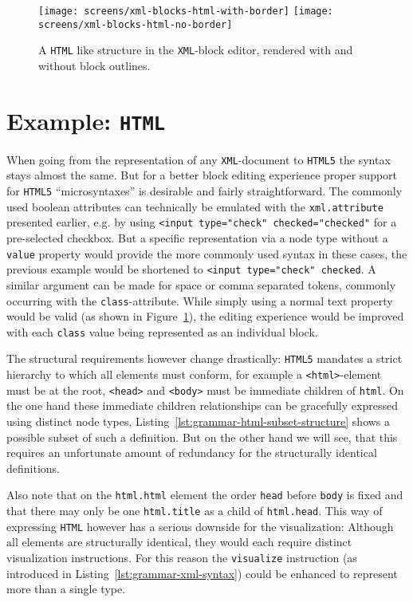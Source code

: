 \documentclass[sigconf,natbib=false,review=true,anonymous]{acmart}
\begin{document}
\begin{figure}
  \texttt{[image: screens/xml-blocks-html-with-border]}
  \texttt{[image: screens/xml-blocks-html-no-border]}
  \caption{A \texttt{HTML} like structure in the \texttt{XML}-block editor, rendered with and without block outlines.}
  \label{fig:screen-editor-xml-no-border}
\end{figure}

\section{Example: \texttt{HTML}}

When going from the representation of any \texttt{XML}-document to \texttt{HTML5} the syntax stays almost the same. But for a better block editing experience proper support for \texttt{HTML5} \enquote{microsyntaxes} is desirable and fairly straightforward. The commonly used boolean attributes can technically be emulated with the \texttt{xml.attribute} presented earlier, e.g. by using \texttt{<input type="check" checked="checked"} for a pre-selected checkbox. But a specific representation via a node type without a \texttt{value} property would provide the more commonly used syntax in these cases, the previous example would be shortened to \texttt{<input type="check" checked}. A similar argument can be made for space or comma separated tokens, commonly occurring with the \texttt{class}-attribute. While simply using a normal text property would be valid (as shown in Figure~\ref{fig:screen-editor-xml-no-border}), the editing experience would be improved with each \texttt{class} value being represented as an individual block.

The structural requirements however change drastically: \texttt{HTML5} mandates a strict hierarchy to which all elements must conform, for example a \texttt{<html>}-element must be at the root, \texttt{<head>} and \texttt{<body>} must be immediate children of \texttt{html}. On the one hand these immediate children relationships can be gracefully expressed using distinct node types, Listing~\ref{lst:grammar-html-subset-structure} shows a possible subset of such a definition. But on the other hand we will see, that this requires an unfortunate amount of redundancy for the structurally identical definitions.

Also note that on the \texttt{html.html} element the order \texttt{head} before \texttt{body} is fixed and that there may only be one \texttt{html.title} as a child of \texttt{html.head}. This way of expressing \texttt{HTML} however has a serious downside for the visualization: Although all elements are structurally identical, they would each require distinct visualization instructions. For this reason the \texttt{visualize} instruction (as introduced in Listing~\ref{lst:grammar-xml-syntax}) could be enhanced to represent more than a single type.
\end{document}
